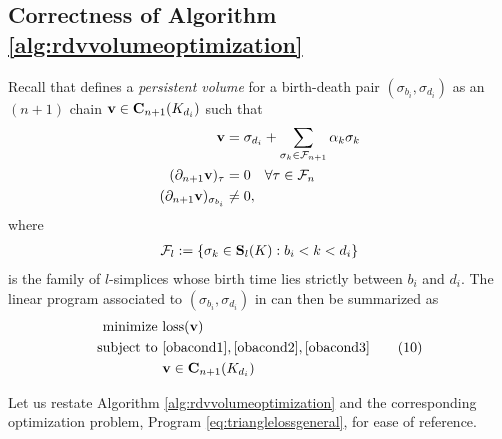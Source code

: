 \documentclass[utf8]{frontiers_suppmat} %
\begin{document}
\subsection{Correctness of Algorithm \ref{alg:rdvvolumeoptimization}}

Recall that \cite{Obayashi2018} defines a \emph{persistent volume} for a birth-death pair $(\sigma_{b_i}, \sigma_{d_i})$ as an $(n+1)$ chain $\mathbf{v} \in \mathbf{C}_{n+1}(K_{d_i})$ such that
\begin{align}
    \mathbf{v}   & = \sigma_{d_i} + \sum_{\sigma_k \in \mathcal{F}_{n+1}} \alpha_k\sigma_k \label{obacond1} \\
    (\partial_{n+1} \mathbf{v})_\tau  & = 0 \quad \forall \tau \in \mathcal{F}_n \label{obacond2}\\
    (\partial_{n+1} \mathbf{v})_{\sigma_{b_i}}  & \ne 0, \label{obacond3}
\end{align}
where 
    \begin{align}
        {\mathcal F}_l := \{ \sigma_k \in \mathbf{S}_l(K) : b_i < k < d_i \}
        \label{eq:fdef}
    \end{align}
is the family of $l$-simplices whose birth time lies strictly between $b_i$ and $d_i$.
The linear program associated to $(\sigma_{b_i}, \sigma_{d_i})$ in \cite{Obayashi2018} can then be summarized as 
\begin{align}
\begin{split}
    \text{minimize } & \mathrm{loss}(\mathbf{v}) \\
    \text{subject to } 
    & \eqref{obacond1}, \eqref{obacond2}, \eqref{obacond3}\\
    & \textbf{v} \in \mathbf{C}_{n+1}(K_{d_i}) 
\end{split}
\tag{10}
\label{eq:generalminimalvolume}
\end{align}


Let us restate Algorithm \ref{alg:rdvvolumeoptimization} and the corresponding optimization problem, Program \eqref{eq:trianglelossgeneral}, for ease of reference.
\end{document}
